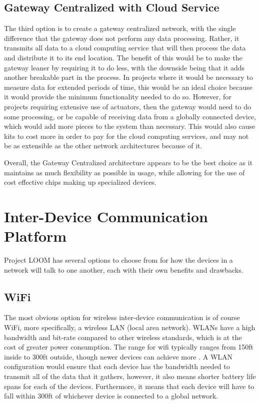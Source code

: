 \documentclass[onecolumn, draftclsnofoot,10pt, compsoc]{IEEEtran}
\begin{document}
	\subsection{Gateway Centralized with Cloud Service}
	The third option is to create a gateway centralized network, with the single difference
	that the gateway does not perform any data processing. Rather, it transmits all data to
	a cloud computing service that will then process the data and distribute it to its end 
	location. The benefit of this would be to make the gateway leaner by requiring it to do 
	less, with the downside being that it adds another breakable part in the process. In 
	projects where it would be necessary to measure data for extended periods of time, this
	would be an ideal choice because it would provide the minimum functionality needed to 
	do so. However, for projects requiring extensive use of actuators, then the gateway 
	would need to do some processing, or be capable of receiving data from a globally 
	connected device, which would add more pieces to the system than necessary. This would
	also cause kits to cost more in order to pay for the cloud computing services, and may
	not be as extensible as the other network architectures because of it. 
	
Overall, the Gateway Centralized architecture appears to be the best choice as it maintains
as much flexibility as possible in usage, while allowing for the use of cost effective chips
making up specialized devices.	

\section{Inter-Device Communication Platform}
Project LOOM has several options to choose from for how the devices in a network will talk to one another, 
each with their own benefits and drawbacks. 
	\subsection{WiFi}
	The most obvious option for wireless inter-device communication is of course WiFi, more
	specifically, a wireless LAN (local area network). WLANs have a high bandwidth and bit-rate
	compared to other wireless standards, which is at the cost of greater power consumption. The range
	for wifi typically ranges from 150ft inside to 300ft outside, though newer devices can 
	achieve more \cite{WiFi}. A WLAN configuration would ensure that each device has the bandwidth needed 
	to transmit all of the data that it gathers, however, it also means shorter battery life spans
	for each of the devices. Furthermore, it means that each device will have to fall within 
	300ft of whichever device is connected to a global network. 
\end{document}
